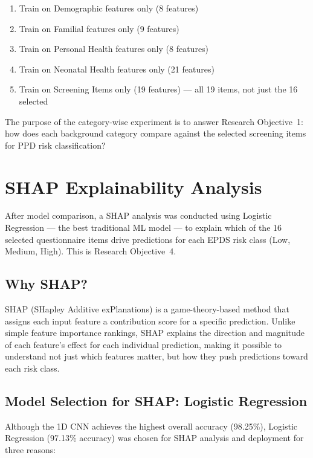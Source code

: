 \begin{enumerate}
    \item Train on Demographic features only (8 features)
    \item Train on Familial features only (9 features)
    \item Train on Personal Health features only (8 features)
    \item Train on Neonatal Health features only (21 features)
    \item Train on Screening Items only (19 features) --- all 19 items, not just the 16 selected
\end{enumerate}

The purpose of the category-wise experiment is to answer Research Objective~1: how does each background category compare against the selected screening items for PPD risk classification?

\section{SHAP Explainability Analysis}
\label{ch3-sec-shap}

After model comparison, a SHAP analysis was conducted using Logistic Regression — the best traditional ML model — to explain which of the 16 selected questionnaire items drive predictions for each EPDS risk class (Low, Medium, High). This is Research Objective~4.

\subsection{Why SHAP?}

SHAP (SHapley Additive exPlanations) is a game-theory-based method that assigns each input feature a contribution score for a specific prediction. Unlike simple feature importance rankings, SHAP explains the direction and magnitude of each feature's effect for each individual prediction, making it possible to understand not just which features matter, but how they push predictions toward each risk class.

\subsection{Model Selection for SHAP: Logistic Regression}

Although the 1D CNN achieves the highest overall accuracy (98.25\%), Logistic Regression (97.13\% accuracy) was chosen for SHAP analysis and deployment for three reasons:

